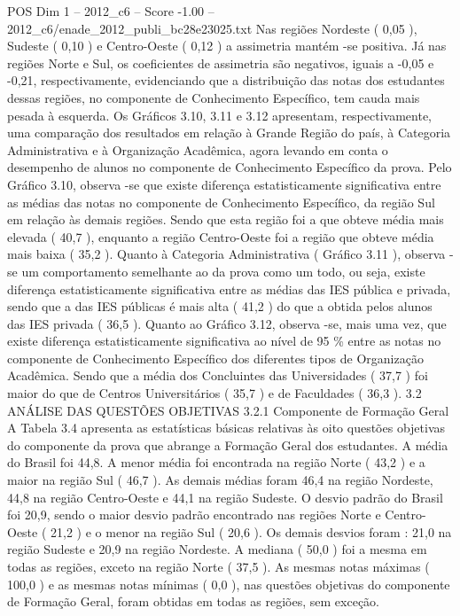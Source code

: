 \begin{textsample}{POS Dim 1 – 2012\_c6 – Score -1.00 – 2012\_c6/enade\_2012\_publi\_bc28e23025.txt}
Nas regiões Nordeste ( 0,05 ), Sudeste ( 0,10 ) e Centro-Oeste ( 0,12 ) a assimetria mantém -se positiva.
Já nas regiões Norte e Sul, os coeficientes de assimetria são negativos, iguais a -0,05 e -0,21, respectivamente, evidenciando que a distribuição das notas dos estudantes dessas regiões, no componente de Conhecimento Específico, tem cauda mais pesada à esquerda.
Os Gráficos 3.10, 3.11 e 3.12 apresentam, respectivamente, uma comparação dos resultados em relação à Grande Região do país, à Categoria Administrativa e à Organização Acadêmica, agora levando em conta o desempenho de alunos no componente de Conhecimento Específico da prova.
Pelo Gráfico 3.10, observa -se que existe diferença estatisticamente significativa entre as médias das notas no componente de Conhecimento Específico, da região Sul em relação às demais regiões.
Sendo que esta região foi a que obteve média mais elevada ( 40,7 ), enquanto a região Centro-Oeste foi a região que obteve média mais baixa ( 35,2 ).
Quanto à Categoria Administrativa ( Gráfico 3.11 ), observa -se um comportamento semelhante ao da prova como um todo, ou seja, existe diferença estatisticamente significativa entre as médias das IES pública e privada, sendo que a das IES públicas é mais alta ( 41,2 ) do que a obtida pelos alunos das IES privada ( 36,5 ).
Quanto ao Gráfico 3.12, observa -se, mais uma vez, que existe diferença estatisticamente significativa ao nível de 95 \% entre as notas no componente de Conhecimento Específico dos diferentes tipos de Organização Acadêmica.
Sendo que a média dos Concluintes das Universidades ( 37,7 ) foi maior do que de Centros Universitários ( 35,7 ) e de Faculdades ( 36,3 ). 3.2 ANÁLISE DAS QUESTÕES OBJETIVAS 3.2.1 Componente de Formação Geral A Tabela 3.4 apresenta as estatísticas básicas relativas às oito questões objetivas do componente da prova que abrange a Formação Geral dos estudantes.
A média do Brasil foi 44,8.
A menor média foi encontrada na região Norte ( 43,2 ) e a maior na região Sul ( 46,7 ).
As demais médias foram 46,4 na região Nordeste, 44,8 na região Centro-Oeste e 44,1 na região Sudeste.
O desvio padrão do Brasil foi 20,9, sendo o maior desvio padrão encontrado nas regiões Norte e Centro-Oeste ( 21,2 ) e o menor na região Sul ( 20,6 ).
Os demais desvios foram : 21,0 na região Sudeste e 20,9 na região Nordeste.
A mediana ( 50,0 ) foi a mesma em todas as regiões, exceto na região Norte ( 37,5 ).
As mesmas notas máximas ( 100,0 ) e as mesmas notas mínimas ( 0,0 ), nas questões objetivas do componente de Formação Geral, foram obtidas em todas as regiões, sem exceção.

\end{textsample}
